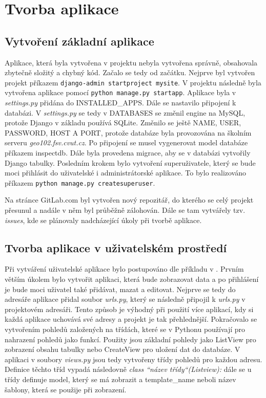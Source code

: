 \chapter{Tvorba aplikace}
\label{4-tvorba-aplikace}

\section{Vytvoření základní aplikace}

Aplikace, která byla vytvořena v projektu  nebyla vytvořena
správně, obsahovala zbytečně složitý a chybný kód. Začalo se tedy
od začátku. Nejprve byl vytvořen projekt příkazem {\tt django-admin 
startproject mysite}. V projektu následně byla vytvořena aplikace
pomocí {\tt python manage.py startapp}. Aplikace byla v
\emph{settings.py} přidána do INSTALLED\_APPS. Dále se
nastavilo připojení k databázi. V \emph{settings.py} se tedy v
DATABASES se změnil engine na MySQL, protože Django v základu
používá SQLite. Změnilo se ještě NAME, USER, PASSWORD, HOST A PORT,
protože databáze byla provozována na školním serveru
\emph{geo102.fsv.cvut.cz}. Po připojení se musel vygenerovat model databáze
příkazem inspectdb. Dále byla
provedena migrace, aby se v databázi vytvořily Django
tabulky. Posledním krokem bylo vytvoření superuživatele, který se bude
moci přihlásit do uživatelské i administrátorské aplikace. To bylo
realizováno příkazem {\tt python manage.py createsuperuser}.

Na stránce GitLab.com byl vytvořen nový repozitář, do kterého se celý
projekt přesunul a nadále v něm byl průběžně zálohován. Dále se tam
vytvářely tzv. \emph{issues}, kde se plánovaly nadcházející úkoly při
tvorbě aplikace.

\section{Tvorba aplikace v uživatelském prostředí}
Při vytváření uživatelské aplikace bylo postupováno dle příkladu v \cite{django-for-beginners}.
Prvním větším úkolem bylo vytvořit aplikaci, která bude zobrazovat
data a po přihlášení je bude moci uživatel také přidávat, mazat a
editovat. Nejprve se tedy do adresáře aplikace přidal soubor \emph{urls.py},
který se následně připojil k \emph{urls.py} v projektovém adresáři. Tento
způsob je výhodný při použití více aplikací, kdy si každá aplikace
uchovává své  adresy a projekt je tak přehlednější. Pokračovalo se
vytvořením pohledů založených na třídách, které se v Pythonu používají
pro nahrazení pohledů jako funkcí. Použity jsou základní pohledy jako
ListView pro zobrazení obsahu tabulky nebo CreateView pro uložení dat
do databáze. V aplikaci v soubory \emph{views.py} jsou tedy vytvořeny
třídy pohledů pro každou  adresu. Definice těchto tříd vypadá
následovně \emph{class “název třídy“(Listview):} dále se u třídy
definuje model, který se má zobrazit a template\_name neboli název
šablony, která se použije při zobrazení.


